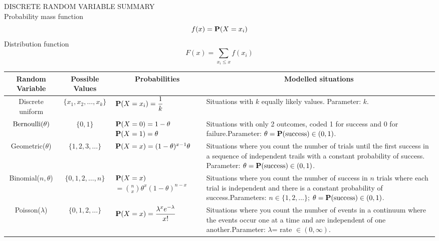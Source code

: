 DISCRETE RANDOM VARIABLE SUMMARY\\

Probability mass function $$f(x)=\mathbf{P}(X=x_i)$$
Distribution function $$F(x)=\sum_{x_i\leq x}f(x_i)$$

\begin{center}
{\renewcommand{\arraystretch}{1.5}
\begin{tabular}{|c|c|p{3.2cm}|p{6.2cm}|}
\multicolumn{1}{c}{\bf Random  Variable} & \multicolumn{1}{c}{\bf Possible  Values}
&\multicolumn{1}{c}{\bf Probabilities} &\multicolumn{1}{c}{\bf Modelled situations} \\\hline
Discrete  uniform&$\{x_1,x_2,\dots,x_k\}$&$\mathbf{P}(X=x_i)=\displaystyle\frac{1}{k}$&Situations with $k$ equally likely values.  Parameter: $k$.\\\hline
$\mbox{{\rm Bernoulli}}(\theta)$&$\{0,1\}$&$\mathbf{P}(X=0)=1-\theta$\newline$\mathbf{P}(X=1)=\theta$&Situations with only 2 outcomes, coded 1 for success and 0 for failure.\newline Parameter: $\theta=\mathbf{P}(\textrm{success}) \in (0, 1)$.\\\hline
Geometric($\theta$)&$\{1,2,3,\dots\}$&$\p(X=x)\newline=(1-\theta)^{x-1}\theta$& Situations where you count the number of trials until the first success in a sequence of independent trails with a constant probability of success. \newline Parameter: $\theta=\mathbf{P}(\textrm{success}) \in (0, 1)$.\\\hline
Binomial($n,\theta$)&$\{0,1,2,\dots,n\}$&$\mathbf{P}(X=x)$\newline $=\displaystyle\binom{n}{x}\theta^x(1-\theta)^{n-x}$&Situations where you count the number of success in $n$ trials where each trial is independent and there is a constant probability of success.\newline Parameters: $n \in \{1,2,\ldots\}$; $\theta=\mathbf{P}(\textrm{success}) \in (0, 1)$.\\\hline
Poisson($\lambda$)&$\{0,1,2,\dots\}$&$\p(X=x)\newline=\displaystyle \frac{\lambda^xe^{-\lambda}}{x!}$&Situations where you count the number of events in a continuum where the events occur one at a time and are independent of one another.\newline Parameter: $\lambda$= rate $\in (0,\infty)$.\\\hline
\end{tabular}}
\end{center}

